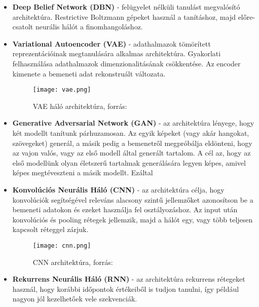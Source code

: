 \begin{itemize}
 \item \textbf{Deep Belief Network (DBN)} - felügyelet nélküli tanulást megvalósító architektúra. Restrictive Boltzmann gépeket használ a tanításhoz, majd előre-csatolt neurális hálót a finomhangoláshoz.
 \item \textbf{Variational Autoencoder (VAE)} - adathalmazok tömörített reprezentációinak megtanulására alkalmas architektúra. Gyakorlati felhasználása adathalmazok dimenzionalitásának csökkentése. Az encoder kimenete a bemeneti adat rekonstruált változata.
\begin{figure}[H]
  \centering
  \texttt{[image: vae.png]}
  \caption{VAE háló architektúra, forrás: \cite{deeplearningbook}}
\end{figure}
 \item \textbf{Generative Adversarial Network (GAN)} - az architektúra lényege, hogy két modellt tanítunk párhuzamosan. Az egyik képeket (vagy akár hangokat, szövegeket) generál, a másik pedig a bemenetről megpróbálja eldönteni, hogy az vajon valós, vagy az első modell által generált tartalom. A cél az, hogy az első modellünk olyan életszerű tartalmak generálására legyen képes, amivel képes megtéveszteni a másik modellt. Ezáltal 
 \item \textbf{Konvolúciós Neurális Háló (CNN)} - az architektúra célja, hogy konvolúciók segítségével releváns alacsony szintű jellemzőket azonosítson be a bemeneti adatokon és ezeket használja fel osztályozáshoz. Az input után konvolúciós és pooling rétegek jellemzik, majd a hálót egy, vagy több teljesen kapcsolt réteggel zárjuk.
 \begin{figure}[H]
  \centering
  \texttt{[image: cnn.png]}
  \caption{CNN architektúra, forrás: \cite{deeplearningbook}}
\end{figure}
 \item \textbf{Rekurrens Neurális Háló (RNN)} - az architektúra rekurrens rétegeket használ, hogy korábbi időpontok értékeiből is tudjon tanulni, így például nagyon jól kezelhetőek vele szekvenciák. \cite{deeplearningbook}
\end{itemize}
